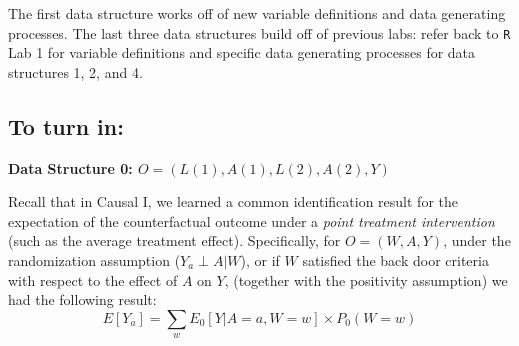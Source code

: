 \documentclass[answers]{exam}
\begin{document}
\noindent The first data structure works off of new variable definitions and data generating processes. The last three data structures build off of previous labs: refer back to \texttt{R} Lab 1 for variable definitions and specific data generating processes for data structures 1, 2, and 4.

\subsection{To turn in:}


\noindent{}

\pagebreak
\noindent\large\textbf{Data Structure 0: $O = (L(1), A(1), L(2), A(2), Y)$}
\normalsize

Recall that in Causal I, we learned a common identification result for the expectation of the counterfactual outcome under a \textit{point treatment intervention} (such as the average treatment effect). Specifically, for $O = (W, A, Y)$, under the randomization assumption ($Y_a \perp A|W$), or if $W$ satisfied the back door criteria with respect to the effect of $A$ on $Y$, (together with the positivity assumption) we had the following result:
\[
E[Y_a] = \sum_{w}E_0[Y|A=a,W=w] \times P_0(W=w)
\]
\end{document}
